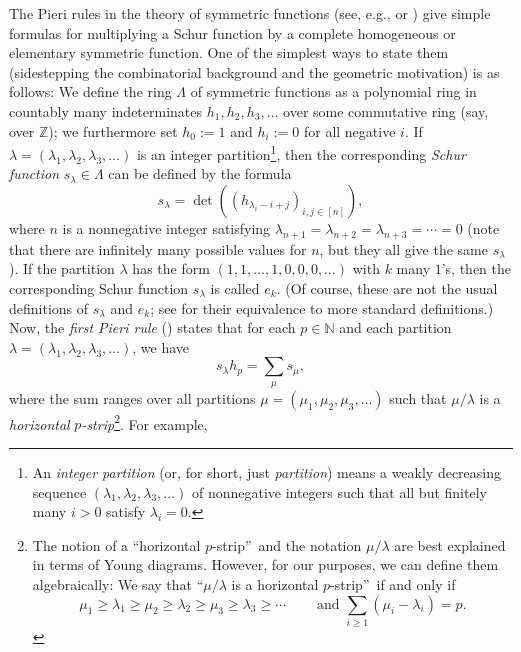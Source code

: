 \documentclass
[numbers=enddot,12pt,final,onecolumn,notitlepage,english]{scrartcl}%
\theoremstyle{definition}
\let\sumnonlimits\sum
\renewcommand{\sum}{\sumnonlimits\limits}
\begin{document}
The Pieri rules in the theory of symmetric functions (see, e.g., \cite[Chapter
I, (5.16) and (5.17)]{Macdon95} or \cite[Theorem 7.15.7 and discussion before
Corollary 7.15.9]{Stanley-EC2}) give simple formulas for multiplying a Schur
function by a complete homogeneous or elementary symmetric function. One of
the simplest ways to state them (sidestepping the combinatorial background and
the geometric motivation) is as follows: We define the ring $\Lambda$ of
symmetric functions as a polynomial ring in countably many indeterminates
$h_{1},h_{2},h_{3},\ldots$ over some commutative ring (say, over $\mathbb{Z}%
$); we furthermore set $h_{0}:=1$ and $h_{i}:=0$ for all negative $i$. If
$\lambda=\left(  \lambda_{1},\lambda_{2},\lambda_{3},\ldots\right)  $ is an
integer partition\footnote{An \emph{integer partition} (or, for short, just
\emph{partition}) means a weakly decreasing sequence $\left(  \lambda
_{1},\lambda_{2},\lambda_{3},\ldots\right)  $ of nonnegative integers such
that all but finitely many $i>0$ satisfy $\lambda_{i}=0$.}, then the
corresponding \emph{Schur function} $s_{\lambda}\in\Lambda$ can be defined by
the formula%
\begin{equation}
s_{\lambda}=\det\left(  \left(  h_{\lambda_{i}-i+j}\right)  _{i,j\in\left[
n\right]  }\right)  , \label{eq.intro.slam=jt}%
\end{equation}
where $n$ is a nonnegative integer satisfying $\lambda_{n+1}=\lambda
_{n+2}=\lambda_{n+3}=\cdots=0$ (note that there are infinitely many possible
values for $n$, but they all give the same $s_{\lambda}$). If the partition
$\lambda$ has the form $\left(  1,1,\ldots,1,0,0,0,\ldots\right)  $ with $k$
many $1$'s, then the corresponding Schur function $s_{\lambda}$ is called
$e_{k}$. (Of course, these are not the usual definitions of $s_{\lambda}$ and
$e_{k}$; see \cite[Chapter I, (3.4) and (3.9)]{Macdon95} for their equivalence
to more standard definitions.) Now, the \emph{first Pieri rule} (\cite[Chapter
I, (5.16)]{Macdon95}) states that for each $p\in\mathbb{N}$ and each partition
$\lambda=\left(  \lambda_{1},\lambda_{2},\lambda_{3},\ldots\right)  $, we have%
\begin{equation}
s_{\lambda}h_{p}=\sum_{\mu}s_{\mu}, \label{eq.intro.pieri1}%
\end{equation}
where the sum ranges over all partitions $\mu=\left(  \mu_{1},\mu_{2},\mu
_{3},\ldots\right)  $ such that $\mu/\lambda$ is a \emph{horizontal }%
$p$\emph{-strip}\footnote{The notion of a \textquotedblleft horizontal
$p$-strip\textquotedblright\ and the notation $\mu/\lambda$ are best explained
in terms of Young diagrams. However, for our purposes, we can define them
algebraically: We say that \textquotedblleft$\mu/\lambda$ is a horizontal
$p$-strip\textquotedblright\ if and only if
\[
\mu_{1}\geq\lambda_{1}\geq\mu_{2}\geq\lambda_{2}\geq\mu_{3}\geq\lambda_{3}%
\geq\cdots\ \ \ \ \ \ \ \ \ \ \text{and }\sum_{i\geq1}\left(  \mu_{i}%
-\lambda_{i}\right)  =p.
\]
}. For example,%
\end{document}
